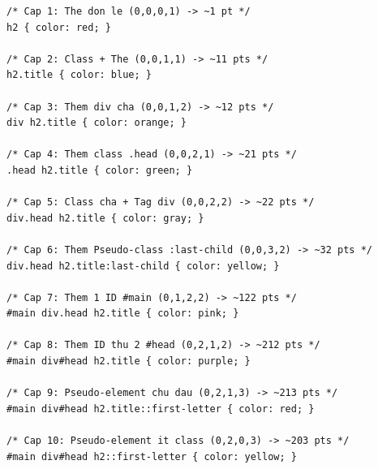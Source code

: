 \documentclass[11pt,oneside]{book}
\begin{document}
\begin{codeWindow}
\begin{lstlisting}[language=CSS3]
/* Cap 1: The don le (0,0,0,1) -> ~1 pt */
h2 { color: red; }

/* Cap 2: Class + The (0,0,1,1) -> ~11 pts */
h2.title { color: blue; }

/* Cap 3: Them div cha (0,0,1,2) -> ~12 pts */
div h2.title { color: orange; }

/* Cap 4: Them class .head (0,0,2,1) -> ~21 pts */
.head h2.title { color: green; }

/* Cap 5: Class cha + Tag div (0,0,2,2) -> ~22 pts */
div.head h2.title { color: gray; }

/* Cap 6: Them Pseudo-class :last-child (0,0,3,2) -> ~32 pts */
div.head h2.title:last-child { color: yellow; }

/* Cap 7: Them 1 ID #main (0,1,2,2) -> ~122 pts */
#main div.head h2.title { color: pink; }

/* Cap 8: Them ID thu 2 #head (0,2,1,2) -> ~212 pts */
#main div#head h2.title { color: purple; }

/* Cap 9: Pseudo-element chu dau (0,2,1,3) -> ~213 pts */
#main div#head h2.title::first-letter { color: red; }

/* Cap 10: Pseudo-element it class (0,2,0,3) -> ~203 pts */
#main div#head h2::first-letter { color: yellow; }
\end{lstlisting}
\end{codeWindow}
\end{document}

